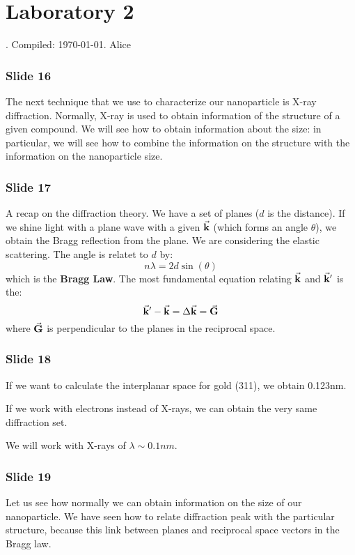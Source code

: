 \documentclass[../main/main.tex]{subfiles}
\begin{document}
\section{Laboratory 2 }

. Compiled: \today. Alice

\subsubsection{Slide 16}

The next technique that we use to characterize our nanoparticle is X-ray diffraction. Normally, X-ray is used to obtain information of the structure of a given compound.
We will see how to obtain information about the size: in particular, we will see how to combine the information on the structure with the information on the nanoparticle size.


\subsubsection{Slide 17}
A recap on the diffraction theory. We have a set of planes (\( d \) is the distance). If we shine light with a plane wave with a given \( \va{k} \) (which forms an angle \( \theta  \)), we obtain the Bragg reflection from the plane. We are considering the elastic scattering. The angle is relatet to \( d \) by:
\begin{equation*}
  n \lambda  = 2d \sin(\theta )
\end{equation*}
which is the \textbf{Bragg Law}.
The most fundamental equation relating \( \va{k} \) and \( \va{k}' \) is the:
\begin{equation*}
  \va{k}' - \va{k} = \Delta \va{k} = \va{G}
\end{equation*}
 where \( \va{G} \) is perpendicular to the planes in the reciprocal space.

 \subsubsection{Slide 18}
If we want to calculate the interplanar space for gold (311), we obtain 0.123nm.

If we work with electrons instead of X-rays, we can obtain the very same diffraction set.

We will work with X-rays of \( \lambda \sim 0.1nm \).

\subsubsection{Slide 19}
Let us see how normally we can obtain information on the size of our nanoparticle. We have seen how to relate diffraction peak with the particular structure, because this link between planes and reciprocal space vectors in the Bragg law.
\end{document}
